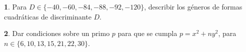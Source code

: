 \theoremstyle{definition}
\newtheorem{ejerGenerosB}{\ejername}[section]


\begin{ejerGenerosB}\label{ejer:generos:b}
	Para $D\in\{-40,-60,-84,-88,-92,-120\}$, describir los g\'eneros
	de formas cuadr\'aticas de discriminante $D$.%
\end{ejerGenerosB}

\begin{ejerGenerosB}\label{ejer:generos:b:primos}
	Dar condiciones sobre un primo $p$ para que se cumpla
	$p=x^2+ny^2$, para $n\in\{6,10,13,15,21,22,30\}$.
\end{ejerGenerosB}

